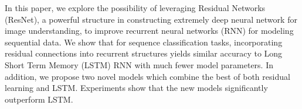 In this paper, we explore the possibility of leveraging Residual Networks (ResNet), a powerful structure in constructing extremely deep neural network for image understanding, to improve recurrent neural networks (RNN) for modeling sequential data. We show that for sequence classification tasks, incorporating residual connections into recurrent structures yields similar accuracy to Long Short Term Memory (LSTM) RNN with much fewer model parameters. In addition, we propose two novel models which combine the best of both residual learning and LSTM. Experiments show that the new models significantly outperform LSTM.
